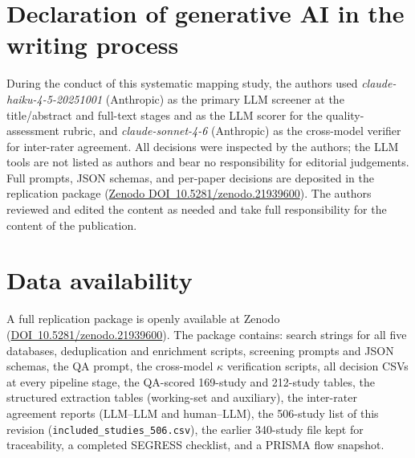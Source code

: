 \documentclass[review,3p,times]{elsarticle}
\newcommand{\zenododoi}{10.5281/zenodo.21939600}
\newcommand{\zenododoiurl}{https://doi.org/\zenododoi}
\begin{document}
\section*{Declaration of generative AI in the writing process}
During the conduct of this systematic mapping study, the authors used
\textit{claude-haiku-4-5-20251001} (Anthropic) as the primary LLM screener
at the title/abstract and full-text stages and as the LLM scorer for the
quality-assessment rubric, and \textit{claude-sonnet-4-6} (Anthropic) as
the cross-model verifier for inter-rater agreement. All decisions were
inspected by the authors; the LLM tools are not listed as authors and
bear no responsibility for editorial judgements. Full prompts, JSON
schemas, and per-paper decisions are deposited in the replication package
(\href{\zenododoiurl}{Zenodo
DOI~\zenododoi}). The authors reviewed and edited the content
as needed and take full responsibility for the content of the
publication.

\section*{Data availability}
A full replication package is openly available at Zenodo
(\href{\zenododoiurl}{DOI~\zenododoi}).
The package contains: search strings for all five databases, deduplication
and enrichment scripts, screening prompts and JSON schemas, the QA prompt,
the cross-model $\kappa$ verification scripts, all decision CSVs at every
pipeline stage, the QA-scored 169-study and 212-study tables, the
structured extraction tables (working-set and auxiliary), the inter-rater
agreement reports (LLM--LLM and human--LLM), the 506-study list of this
revision (\texttt{included\_studies\_506.csv}), the earlier 340-study file
kept for traceability, a completed SEGRESS checklist, and a
PRISMA flow snapshot.


\end{document}
